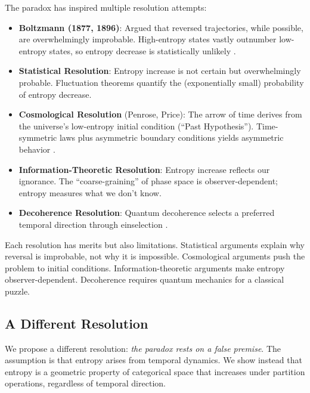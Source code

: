 \documentclass[twocolumn,10pt]{article}
\theoremstyle{definition}
\theoremstyle{remark}
\begin{document}
The paradox has inspired multiple resolution attempts:

\begin{itemize}
\item \textbf{Boltzmann (1877, 1896)}: Argued that reversed trajectories, while possible, are overwhelmingly improbable. High-entropy states vastly outnumber low-entropy states, so entropy decrease is statistically unlikely \citep{boltzmann1877, boltzmann1896}.

\item \textbf{Statistical Resolution}: Entropy increase is not certain but overwhelmingly probable. Fluctuation theorems \citep{evans2002} quantify the (exponentially small) probability of entropy decrease.

\item \textbf{Cosmological Resolution} (Penrose, Price): The arrow of time derives from the universe's low-entropy initial condition (``Past Hypothesis''). Time-symmetric laws plus asymmetric boundary conditions yields asymmetric behavior \citep{penrose2004, price1996}.

\item \textbf{Information-Theoretic Resolution}: Entropy increase reflects our ignorance. The ``coarse-graining'' of phase space is observer-dependent; entropy measures what we don't know.

\item \textbf{Decoherence Resolution}: Quantum decoherence selects a preferred temporal direction through einselection \citep{zurek2003}.
\end{itemize}

Each resolution has merits but also limitations. Statistical arguments explain why reversal is improbable, not why it is impossible. Cosmological arguments push the problem to initial conditions. Information-theoretic arguments make entropy observer-dependent. Decoherence requires quantum mechanics for a classical puzzle.

\subsection{A Different Resolution}

We propose a different resolution: \textit{the paradox rests on a false premise}. The assumption is that entropy arises from temporal dynamics. We show instead that entropy is a geometric property of categorical space that increases under partition operations, regardless of temporal direction.
\end{document}
